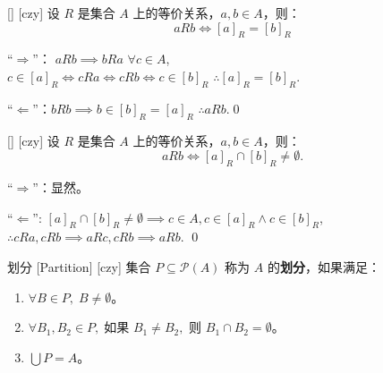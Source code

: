 \documentclass[UTF8]{ctexart}
\begin{document}
        \begin{thm}
            [UUID]
            {}
            []
            [czy]
            设 \( R \) 是集合 \( A \) 上的等价关系，\( a, b \in A \)，则：
            \[
            a R b \iff [a]_R = [b]_R
            \]
        \end{thm}
            
        \begin{prf}

                “\(\Rightarrow\)”： \( a R b \implies b R a \) \( \forall c \in A \),\\
                \(
                c \in [a]_R \iff c R a \iff c R b \iff c \in [b]_R
                \)
                \( \therefore [a]_R = [b]_R \).

                “\(\Leftarrow\)”：\( b R b \implies  b \in [b]_R = [a]_R \) \( \therefore a R b \).\qed
        \end{prf}

        \begin{ppt}
            [UUID]
            {}
            []
            [czy]
            设 \( R \) 是集合 \( A \) 上的等价关系，\( a, b \in A \)，则：
            \[
            a R b \iff [a]_R \cap [b]_R \neq \emptyset.
            \]
        \end{ppt}
        
        \begin{prf}
                “\(\Rightarrow\)”：显然。

                “\(\Leftarrow\)”: \( [a]_R \cap [b]_R \neq \emptyset \implies c \in A , c \in [a]_R \land c \in [b]_R \),\\
                \(
                \therefore c R a , c R b \implies a R c , c R b \implies a R b.
                \)
                \qed            
        \end{prf}

        \begin{dfn}
            [UUID]
            {划分}
            [Partition]
            [czy]
            集合 \( P \subseteq \mathcal{P}(A) \) 称为 \( A \) 的\textbf{划分}，如果满足：
            \begin{enumerate}
                \item \( \forall B \in P, \; B \neq \emptyset \)。
                \item \( \forall B_1, B_2 \in P, \; \text{如果 } B_1 \neq B_2, \text{ 则 } B_1 \cap B_2 = \emptyset \)。
                \item \( \bigcup P = A \)。
            \end{enumerate}
        \end{dfn}
\end{document}
